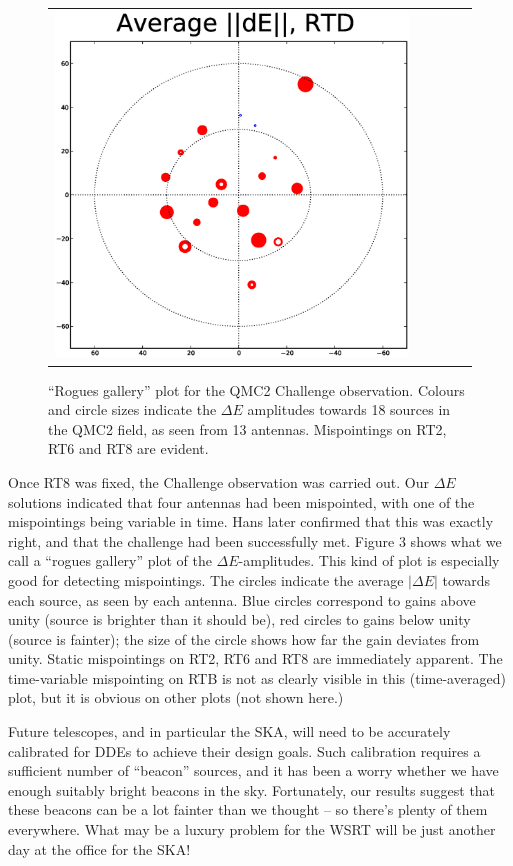 \documentclass[]{article}
\begin{document}
\begin{figure}
\begin{tabular}{@{}c@{}c@{}c@{}c@{}c@{}}
\includegraphics[width=\roguewidth]{qmc2b_dE_antD} 
\end{tabular}
\caption{``Rogues gallery'' plot for the QMC2 Challenge observation. Colours and circle sizes indicate the $\Delta E$ amplitudes towards 18 sources in the QMC2 field, as seen from 13 antennas. Mispointings on RT2, RT6 and RT8 are evident.}
\end{figure}


Once RT8 was fixed, the Challenge observation was carried out. Our $\Delta E$ solutions indicated that four antennas had been mispointed, with one of the mispointings being variable in time. Hans later confirmed that this was exactly right, and that the challenge had been successfully met. Figure 3 shows what we call a ``rogues gallery'' plot of the $\Delta E$-amplitudes. This kind of plot is especially good for detecting mispointings. The circles indicate the average $|\Delta E|$ towards each source, as seen by each antenna. Blue circles correspond to gains above unity (source is brighter than it should be), red circles to gains below unity (source is fainter); the size of the circle shows how far the gain deviates from unity. Static mispointings on RT2, RT6 and RT8 are immediately apparent. The time-variable mispointing on RTB is not as clearly visible in this (time-averaged) plot, but it is obvious on other plots (not shown here.)

Future telescopes, and in particular the SKA, will need to be accurately calibrated for DDEs to achieve their design goals. Such calibration requires a sufficient number of ``beacon'' sources, and it has been a worry whether we have enough suitably bright beacons in the sky. Fortunately, our results suggest that these beacons can be a lot fainter than we thought -- so there's plenty of them everywhere. What may be a luxury problem for the WSRT will be just another day at the office for the SKA!
 
\end{document}
